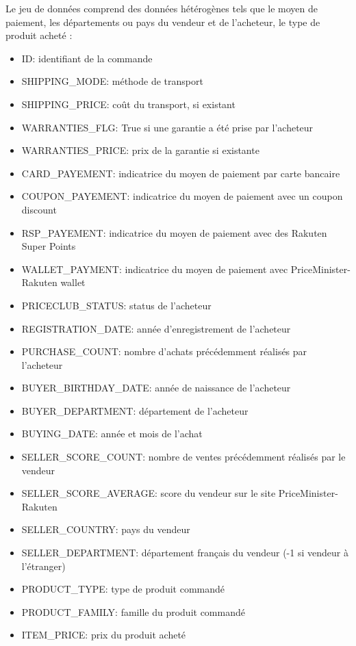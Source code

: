 Le jeu de données comprend des données hétérogènes tels que le moyen de paiement, les
départements ou pays du vendeur et de l'acheteur, le type de produit acheté :

\begin{itemize}
\item ID: identifiant de la commande
\item SHIPPING_MODE: méthode de transport
\item SHIPPING_PRICE: coût du transport, si existant
\item WARRANTIES_FLG: True si une garantie a été prise par l'acheteur
\item WARRANTIES_PRICE: prix de la garantie si existante
\item CARD_PAYEMENT: indicatrice du moyen de paiement par carte bancaire
\item COUPON_PAYEMENT: indicatrice du moyen de paiement avec un coupon discount 
\item RSP_PAYEMENT: indicatrice du moyen de paiement avec des Rakuten Super Points
\item WALLET_PAYMENT: indicatrice du moyen de paiement avec PriceMinister-Rakuten wallet
\item PRICECLUB_STATUS: status de l'acheteur
\item REGISTRATION_DATE: année d'enregistrement de l'acheteur
\item PURCHASE_COUNT: nombre d'achats précédemment réalisés par l'acheteur
\item BUYER_BIRTHDAY_DATE: année de naissance de l'acheteur
\item BUYER_DEPARTMENT: département de l'acheteur
\item BUYING_DATE: année et mois de l'achat
\item SELLER_SCORE_COUNT: nombre de ventes précédemment réalisés par le vendeur
\item SELLER_SCORE_AVERAGE: score du vendeur sur le site PriceMinister-Rakuten
\item SELLER_COUNTRY: pays du vendeur
\item SELLER_DEPARTMENT: département français du vendeur (-1 si vendeur à l'étranger)
\item PRODUCT_TYPE: type de produit commandé
\item PRODUCT_FAMILY: famille du produit commandé
\item ITEM_PRICE: prix du produit acheté

\end{itemize}

